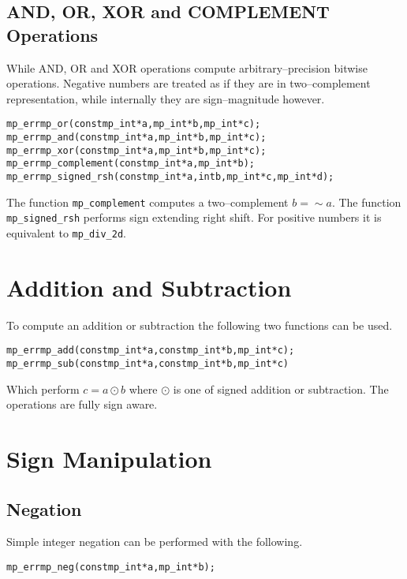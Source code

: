 \documentclass[synpaper]{book}
\begin{document}
\subsection{AND, OR, XOR and COMPLEMENT Operations}

While AND, OR and XOR operations compute arbitrary--precision bitwise operations. Negative numbers
are treated as if they are in two--complement representation, while internally they are
sign--magnitude however.

    
\begin{alltt}
mp_err mp_or  (const mp_int *a, mp_int *b, mp_int *c);
mp_err mp_and (const mp_int *a, mp_int *b, mp_int *c);
mp_err mp_xor (const mp_int *a, mp_int *b, mp_int *c);
mp_err mp_complement(const mp_int *a, mp_int *b);
mp_err mp_signed_rsh(const mp_int *a, int b, mp_int *c, mp_int *d);
\end{alltt}

The function \texttt{mp\_complement} computes a two--complement $b = \sim a$. The function
\texttt{mp\_signed\_rsh} performs sign extending right shift. For positive numbers it is equivalent
to \texttt{mp\_div\_2d}.
\section{Addition and Subtraction}

To compute an addition or subtraction the following two functions can be used.

 
\begin{alltt}
mp_err mp_add (const mp_int *a, const mp_int *b, mp_int *c);
mp_err mp_sub (const mp_int *a, const mp_int *b, mp_int *c)
\end{alltt}

Which perform $c = a \odot b$ where $\odot$ is one of signed addition or subtraction.  The
operations are fully sign aware.

\section{Sign Manipulation}
\subsection{Negation}
\label{sec:NEG}
Simple integer negation can be performed with the following.

\begin{alltt}
mp_err mp_neg (const mp_int *a, mp_int *b);
\end{alltt}
\end{document}
